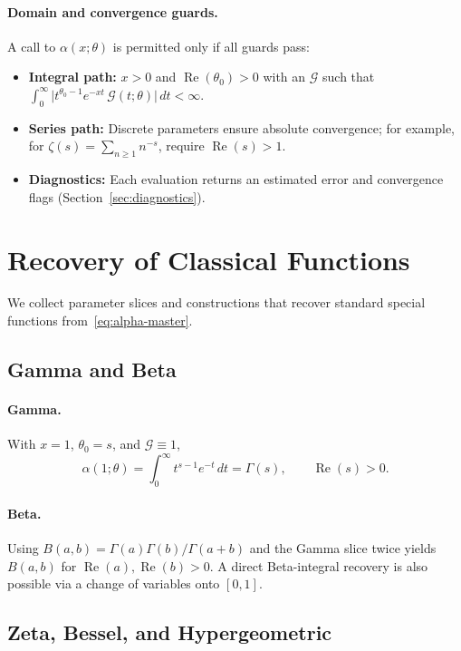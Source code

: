 \documentclass[11pt]{article}
\theoremstyle{remark}
\newcommand{\RePart}{\operatorname{Re}}
\begin{document}
\paragraph{Domain and convergence guards.} A call to \(\alpha(x;\theta)\) is permitted only if all guards pass:
\begin{itemize}[nosep]
  \item \textbf{Integral path:} \(x>0\) and \(\RePart(\theta_0)>0\) with an \(\mathcal{G}\) such that \(\int_0^{\infty}\!\big|t^{\theta_0-1} e^{-xt}\,\mathcal{G}(t;\theta)\big|\,dt<\infty\).
  \item \textbf{Series path:} Discrete parameters ensure absolute convergence; for example, for \(\zeta(s)=\sum_{n\ge1}n^{-s}\), require \(\RePart(s)>1\).
  \item \textbf{Diagnostics:} Each evaluation returns an estimated error and convergence flags (Section~\ref{sec:diagnostics}).
\end{itemize}

\section{Recovery of Classical Functions}
\label{sec:recovery}
We collect parameter slices and constructions that recover standard special functions from~\eqref{eq:alpha-master}.

\subsection{Gamma and Beta}
\paragraph{Gamma.} With \(x=1\), \(\theta_0=s\), and \(\mathcal{G}\equiv1\),
\begin{equation}
\alpha(1;\theta)=\int_0^{\infty}t^{s-1}e^{-t}\,dt=\Gamma(s),\qquad \RePart(s)>0.
\end{equation}
\paragraph{Beta.} Using \(B(a,b)=\Gamma(a)\Gamma(b)/\Gamma(a+b)\) and the Gamma slice twice yields \(B(a,b)\) for \(\RePart(a),\RePart(b)>0\). A direct Beta-integral recovery is also possible via a change of variables onto \([0,1]\).

\subsection{Zeta, Bessel, and Hypergeometric}
\end{document}
